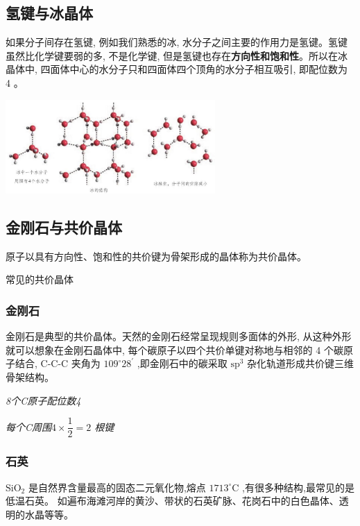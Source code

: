 \documentclass[10pt,cn]{elegantbook}
\begin{document}
 \subsection{氢键与冰晶体}
 
 如果分子间存在氢键, 例如我们熟悉的冰, 水分子之间主要的作用力是氢键。氢键虽然比化学键要弱的多, 不是化学键, 但是氢键也存在\textbf{方向性和饱和性}。所以在冰晶体中, 四面体中心的水分子只和四面体四个顶角的水分子相互吸引, 即配位数为 4 。
 
  \begin{center}
 	\includegraphics[max width=0.6\textwidth]{image/c129.jpg}
 \end{center}
 
 \subsection{金刚石与共价晶体}
 
 原子以具有方向性、饱和性的共价键为骨架形成的晶体称为共价晶体。
 
常见的共价晶体
 


 
 
 \subsubsection{金刚石}
 
  
 金刚石是典型的共价晶体。天然的金刚石经常呈现规则多面体的外形, 从这种外形就可以想象在金刚石晶体中, 每个碳原子以四个共价单键对称地与相邻的 4 个碳原子结合, C-C-C 夹角为 \({109}^{ \circ }{28}^{\prime }\) ,即金刚石中的碳采取 \({\mathrm{{sp}}}^{3}\) 杂化轨道形成共价键三维骨架结构。
 
\textit{ 8个C原子配位数4}
 
\textit{ 每个C周围$4 \times \dfrac{1}{2} = 2 $ 根键}
 
 
 \subsubsection{石英}
 
 \({\mathrm{{SiO}}}_{2}\) 是自然界含量最高的固态二元氧化物,熔点 \({1713}^{ \circ }\mathrm{C}\) ,有很多种结构,最常见的是低温石英。 如遍布海滩河岸的黄沙、带状的石英矿脉、花岗石中的白色晶体、透明的水晶等等。
 
\end{document}
